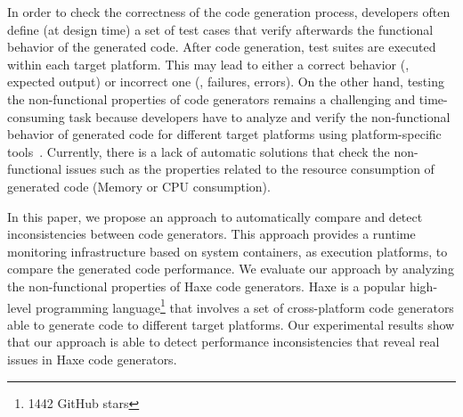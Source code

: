 In order to check the correctness of the code generation process, developers often define (at design time) a set of test cases that verify afterwards the functional behavior of the generated code. After code generation, test suites are executed within each target platform. This may lead to either a correct behavior (\ie, expected output) or incorrect one (\ie, failures, errors).
On the other hand, testing the non-functional properties of code generators remains a challenging and time-consuming task because developers have to analyze and verify the non-functional behavior of generated code for different target platforms using platform-specific tools~\cite{guana2014chaintracker,delgado2004taxonomy}. Currently, there is a lack of automatic solutions that check the non-functional issues such as the properties related to the resource consumption of generated code (Memory or CPU consumption).



In this paper, we propose an approach to automatically compare and detect inconsistencies between code generators. This approach provides a runtime monitoring infrastructure based on system containers, as execution platforms, to compare the generated code performance. %
We evaluate our approach by analyzing the non-functional properties of Haxe code generators. Haxe is a popular high-level programming language\footnote{\num{1442} GitHub stars} that involves a set of cross-platform code generators able to generate code to different target platforms. Our experimental results show that our approach is able to detect performance inconsistencies that reveal real issues in Haxe code generators.



